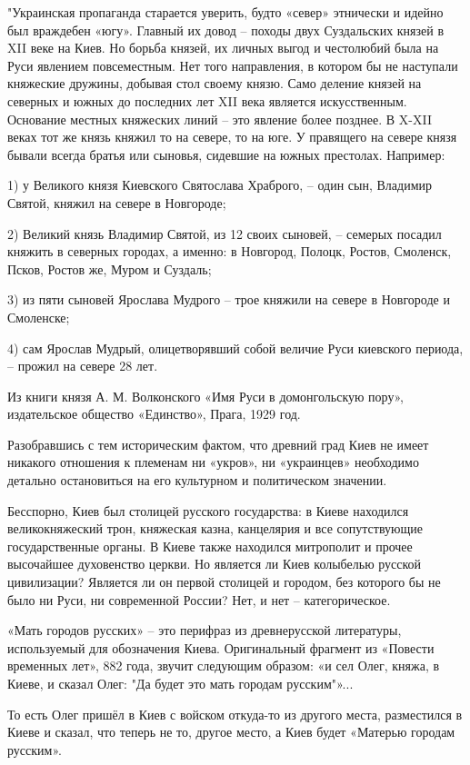 "Украинская пропаганда старается уверить, будто «север» этнически и идейно был
враждебен «югу». Главный их довод – походы двух Суздальских князей в XII веке
на Киев. Но борьба князей, их личных выгод и честолюбий была на Руси явлением
повсеместным. Нет того направления, в котором бы не наступали княжеские
дружины, добывая стол своему князю. Само деление князей на северных и южных до
последних лет XII века является искусственным. Основание местных княжеских
линий – это явление более позднее. В X-XII веках тот же князь княжил то на
севере, то на юге. У правящего на севере князя бывали всегда братья или
сыновья, сидевшие на южных престолах. Например:

1) у Великого князя Киевского Святослава Храброго, – один сын, Владимир Святой,
княжил на севере в Новгороде;

2) Великий князь Владимир Святой, из 12 своих сыновей, – семерых посадил
княжить в северных городах, а именно: в Новгород, Полоцк, Ростов, Смоленск,
Псков, Ростов же, Муром и Суздаль;

3) из пяти сыновей Ярослава Мудрого – трое княжили на севере в Новгороде и
Смоленске;

4) сам Ярослав Мудрый, олицетворявший собой величие Руси киевского периода, –
прожил на севере 28 лет.

Из книги князя А. М. Волконского «Имя Руси в домонгольскую пору», издательское
общество «Единство», Прага, 1929 год.

Разобравшись с тем историческим фактом, что древний град Киев не имеет никакого
отношения к племенам ни «укров», ни «украинцев» необходимо детально
остановиться на его культурном и политическом значении.

Бесспорно, Киев был столицей русского государства: в Киеве находился
великокняжеский трон, княжеская казна, канцелярия и все сопутствующие
государственные органы. В Киеве также находился митрополит и прочее высочайшее
духовенство церкви. Но является ли Киев колыбелью русской цивилизации? Является
ли он первой столицей и городом, без которого бы не было ни Руси, ни
современной России? Нет, и нет – категорическое.

«Мать городов русских» – это перифраз из древнерусской литературы, используемый
для обозначения Киева. Оригинальный фрагмент из «Повести временных лет», 882
года, звучит следующим образом: «и сел Олег, княжа, в Киеве, и сказал Олег: "Да
будет это мать городам русским"»...

То есть Олег пришёл в Киев с войском откуда-то из другого места, разместился в
Киеве и сказал, что теперь не то, другое место, а Киев будет «Матерью городам
русским».

